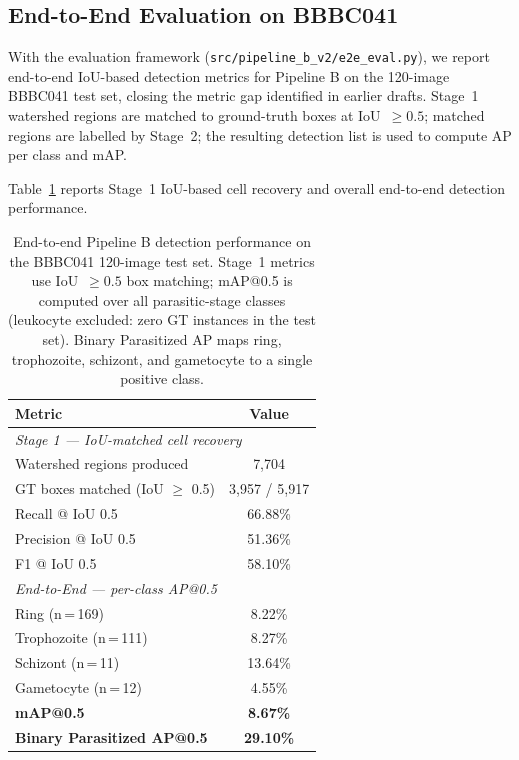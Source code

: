 \documentclass[review,12pt]{elsarticle}
\begin{document}
\subsection{End-to-End Evaluation on BBBC041}
\label{ssec:e2e_bbbc041}

With the evaluation framework (\texttt{src/pipeline\_b\_v2/e2e\_eval.py}),
we report end-to-end IoU-based detection metrics for Pipeline B on the
120-image BBBC041 test set, closing the metric gap identified in earlier
drafts. Stage~1 watershed regions are matched to ground-truth boxes at
IoU~$\geq 0.5$; matched regions are labelled by Stage~2; the resulting
detection list is used to compute AP per class and mAP.

Table~\ref{tab:e2e_bbbc041} reports Stage~1 IoU-based cell recovery and
overall end-to-end detection performance.

\begin{table}[H]
\centering
\small
\caption{End-to-end Pipeline B detection performance on the BBBC041
  120-image test set. Stage~1 metrics use IoU~$\geq 0.5$ box matching;
  mAP@0.5 is computed over all parasitic-stage classes (leukocyte
  excluded: zero GT instances in the test set). Binary Parasitized AP
  maps ring, trophozoite, schizont, and gametocyte to a single positive
  class.}
\label{tab:e2e_bbbc041}
\renewcommand{\arraystretch}{1.15}
\begin{tabular}{lc}
\toprule
\textbf{Metric} & \textbf{Value} \\
\midrule
\multicolumn{2}{l}{\textit{Stage 1 --- IoU-matched cell recovery}} \\
Watershed regions produced           & 7,704 \\
GT boxes matched (IoU $\geq$ 0.5)   & 3,957 / 5,917 \\
Recall @ IoU 0.5                     & 66.88\% \\
Precision @ IoU 0.5                  & 51.36\% \\
F1 @ IoU 0.5                         & 58.10\% \\
\midrule
\multicolumn{2}{l}{\textit{End-to-End --- per-class AP@0.5}} \\
Ring \hfill (n\,=\,169)             & 8.22\% \\
Trophozoite \hfill (n\,=\,111)      & 8.27\% \\
Schizont \hfill (n\,=\,11)          & 13.64\% \\
Gametocyte \hfill (n\,=\,12)        & 4.55\% \\
\midrule
\textbf{mAP@0.5}                     & \textbf{8.67\%} \\
\textbf{Binary Parasitized AP@0.5}   & \textbf{29.10\%} \\
\bottomrule
\end{tabular}
\end{table}
\end{document}
